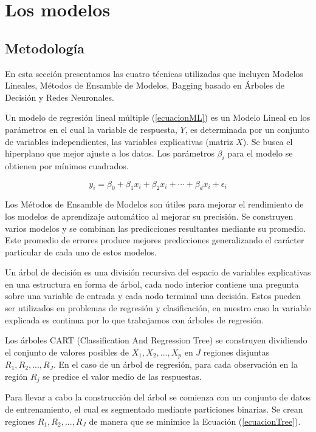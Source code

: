 \documentclass[a4paper,12pt,twocolumn]{article}
\begin{document}
\section{Los modelos}


\subsection{Metodología}

En esta sección presentamos las cuatro técnicas utilizadas que incluyen Modelos Lineales, Métodos de Ensamble de Modelos, Bagging basado en Árboles de Decisión y Redes Neuronales.

Un modelo de regresión lineal múltiple (\ref{ecuacionML}) es un Modelo Lineal en los parámetros en el cual la variable de respuesta, $Y$, es determinada por un conjunto de variables independientes, las variables explicativas (matriz $X$). Se busca el hiperplano que mejor ajuste a los datos. Los parámetros $\beta_i$ para el modelo se obtienen por mínimos cuadrados.

\begin{equation}
y_{i}=\beta_{0}+\beta_{1} x_{i}+\beta_{2} x_{i}+\cdots+\beta_{d} x_{i}+\epsilon_{i}
\label{ecuacionML}
\end{equation}

Los Métodos de Ensamble de Modelos son útiles para mejorar el rendimiento de los modelos de aprendizaje automático al mejorar su precisión. Se construyen varios modelos y se combinan las predicciones resultantes mediante su promedio. Este promedio de errores produce mejores predicciones generalizando el carácter particular de cada uno de estos modelos.

Un árbol de decisión es una división recursiva del espacio de variables explicativas en una estructura en forma de árbol, cada nodo interior contiene una pregunta sobre una variable de entrada y cada nodo terminal una decisión. Estos pueden ser utilizados en problemas de regresión y clasificación, en nuestro caso la variable explicada es continua por lo que trabajamos con árboles de regresión.  

Los árboles CART (Classification And Regression Tree) se construyen dividiendo el conjunto de valores posibles de $X_1,X_2,...,X_p$ en $J$ regiones disjuntas $R_1, R_2,..., R_J$. En el caso de un árbol de regresión, para cada observación en la región $R_j$ se predice el valor medio de las respuestas.

Para llevar a cabo la construcción del árbol se comienza con un conjunto de datos de entrenamiento, el cual es segmentado mediante particiones binarias. Se crean regiones $R_1, R_2,..., R_J$ de manera que se minimice la Ecuación (\ref{ecuacionTree}).
\end{document}
